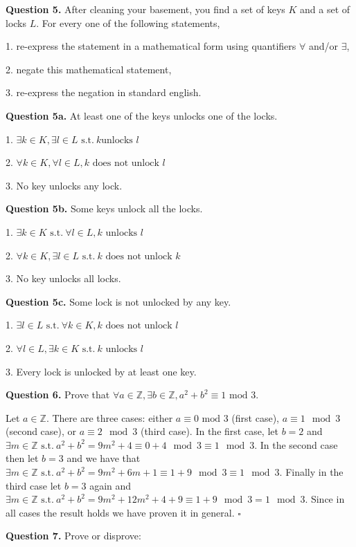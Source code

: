 \documentclass[letterpaper, reqno,11pt]{article}
\newcommand{\ZZ}{\mathbb{Z}}
\newcommand{\st}{\text{ s.t.}\ }
\begin{document}
{\noindent\bf Question 5.} After cleaning your basement, you find a set of keys $K$ and a set of locks $L$. For every one of the following statements, 

1. re-express the statement in a mathematical form using quantifiers $\forall$ and/or $\exists$, 

2. negate this mathematical statement, 

3. re-express the negation in standard english. 

{\noindent\bf Question 5a.} At least one of the keys unlocks one of the locks. 

\medskip

1. $\exists k\in K, \exists l\in L\st k\text{unlocks }l$

2. $\forall k\in K, \forall l\in L, k\text{ does not unlock } l$

3. No key unlocks any lock. 

{\noindent\bf Question 5b.} Some keys unlock all the locks. 

\medskip

1. $\exists k\in K \st \forall l\in L, k\text{ unlocks } l$

2. $\forall k\in K, \exists l\in L\st k\text{ does not unlock } k$

3. No key unlocks all locks. 

{\noindent\bf Question 5c.} Some lock is not unlocked by any key. 

\medskip

1. $\exists l\in L\st\forall k\in K, k\text{ does not unlock }l$

2. $\forall l\in L, \exists k\in K\st k\text{ unlocks }l$

3. Every lock is unlocked by at least one key. 

{\noindent\bf Question 6.} Prove that $\forall a\in\ZZ, \exists b\in\ZZ, a^2+b^2\equiv 1\text{ mod }3$. 


Let $a\in\ZZ$. There are three cases: either $a\equiv 0\text{ mod }3$ (first case), $a\equiv 1\mod 3$ (second case), or $a\equiv 2\mod 3$ (third case). In the first case, let $b=2$ and $\exists m\in\ZZ\st a^2+b^2=9m^2+4\equiv 0+4\mod 3\equiv 1\mod3$. In the second case then let $b=3$ and we have that $\exists m\in\ZZ\st a^2+b^2=9m^2+6m+1\equiv 1+9\mod3\equiv1\mod3$. Finally in the third case let $b=3$ again and $\exists m\in\ZZ\st a^2+b^2=9m^2+12m^2+4+9\equiv1+9\mod3=1\mod3$. Since in all cases the result holds we have proven it in general. $\square$

{\noindent\bf Question 7.} Prove or disprove: 
\end{document}

